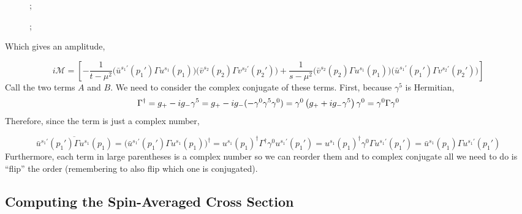 \documentclass[12pt]{article}
\begin{document}
\begin{figure}
\centering
\begin{minipage}{.5\textwidth}
  \centering
  
;

\end{minipage}%
\begin{minipage}{.5\textwidth}
  \centering
  
;

\end{minipage}
\end{figure}
Which gives an amplitude,

\[ i \mathcal{M} = \left[ - \frac{1}{t - \mu^2} \bigg( \bar{u}^{s_1'}(p_1') \Gamma u^{s_1}(p_1) \bigg) 
\bigg( \bar{v}^{s_2}(p_2) \Gamma v^{s_2'}(p_2') \bigg) 
+  \frac{1}{s - \mu^2} \bigg( \bar{v}^{s_2}(p_2) \Gamma u^{s_1}(p_1) \bigg) 
\bigg( \bar{u}^{s_1'}(p_1') \Gamma v^{s_2'}(p_2') \bigg) \right]
\]
Call the two terms $A$ and $B$. We need to consider the complex conjugate of these terms. First, because $\gamma^5$ is Hermitian,
\[ \Gamma^\dagger = g_{+} - i g_{-} \gamma^5 = g_{+} - i g_{-} (- \gamma^0 \gamma^5 \gamma^0) = \gamma^0 \left(g_{+} + i g_{-} \gamma^5 \right) \gamma^0 = \gamma^0 \Gamma \gamma^0 \]
Therefore, since the term is just a complex number,

\[ \overline{\bar{u}^{s_1'}(p_1') \Gamma u^{s_1}(p_1) } = \bigg( \bar{u}^{s_1'}(p_1') \Gamma u^{s_1}(p_1) \bigg)^\dagger = u^{s_1}(p_1)^\dagger \Gamma^\dagger \gamma^0 u^{s_1'}(p_1') = u^{s_1}(p_1)^\dagger \gamma^0 \Gamma u^{s_1'}(p_1') = \bar{u}^{s_1}(p_1) \Gamma u^{s_1'}(p_1')  \]
Furthermore, each term in large parentheses is a complex number so we can reorder them and to complex conjugate all we need to do is ``flip'' the order (remembering to also flip which one is conjugated). 

\subsection{Computing the Spin-Averaged Cross Section}
\end{document}
